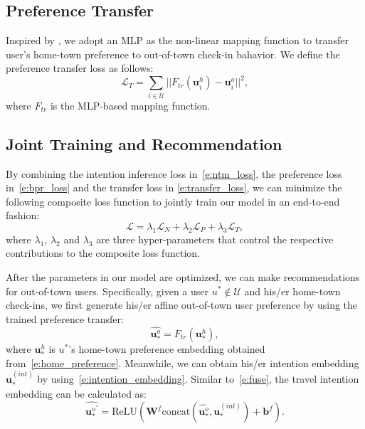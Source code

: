 \documentclass[letterpaper]{article} %
\begin{document}
\subsection{Preference Transfer}
Inspired by \cite{man2017cross}, we adopt an MLP as the non-linear mapping function to transfer user's home-town preference to out-of-town check-in bahavior.
We define the preference transfer loss as follows:
\begin{equation}\label{e:transfer_loss}
    \mathcal{L}_T = 
    \sum_{i \in \mathcal{U}}
     ||F_{tr}\left(\mathbf{u}^h_i\right) - \mathbf{u}^o_i||^2 ,
\end{equation}
where $F_{tr}$ is the MLP-based mapping function. 


\subsection{Joint Training and Recommendation}
By combining the intention inference loss in~\cref{e:ntm_loss}, the preference loss in~\cref{e:bpr_loss} and the transfer loss in \cref{e:transfer_loss}, we can minimize the following composite loss function to jointly train our model in an end-to-end fashion:
%
\begin{equation}\label{e:joint_loss}
    \mathcal{L} = \lambda_1 \mathcal{L}_N + 
    \lambda_2 \mathcal{L}_P +
    \lambda_3 \mathcal{L}_T ,
\end{equation}
%
where $\lambda_1$, $\lambda_2$ and $\lambda_3$ are three hyper-parameters that control the respective contributions to the composite loss function.

After the parameters in our model are optimized, we can make recommendations for out-of-town users.
Specifically, given a user $u^{\ast} \notin \mathcal{U}$ and his/er home-town check-ins, we first generate his/er affine out-of-town user preference by using the trained preference transfer:
\begin{equation}\label{e:affine}
    \widehat{\mathbf{u}^o_{\ast}} = F_{tr}(\mathbf{u}^h_{\ast}) ,
\end{equation}
where $\mathbf{u}^h_{\ast}$ is $u^{\ast}$'s home-town preference embedding obtained from~\cref{e:home_preference}.
Meanwhile, we can obtain his/er intention embedding $\mathbf{u}^{(int)}_{\ast}$ by using~\cref{e:intention_embedding}. 
Similar to~\cref{e:fuse}, the travel intention embedding can be calculated as:
\begin{equation}\label{e:fuse_test}
    \widehat{{\mathbf{u}^o_{\ast}}^{\prime}} = 
    \mathrm{ReLU}\left(
    \mathbf{W}^f \mathrm{concat} \left(
        \widehat{\mathbf{u}^o_{\ast}}, \mathbf{u}^{(int)}_{\ast}
    \right)
    + \bm{b}^f
    \right) .
\end{equation}
\end{document}
